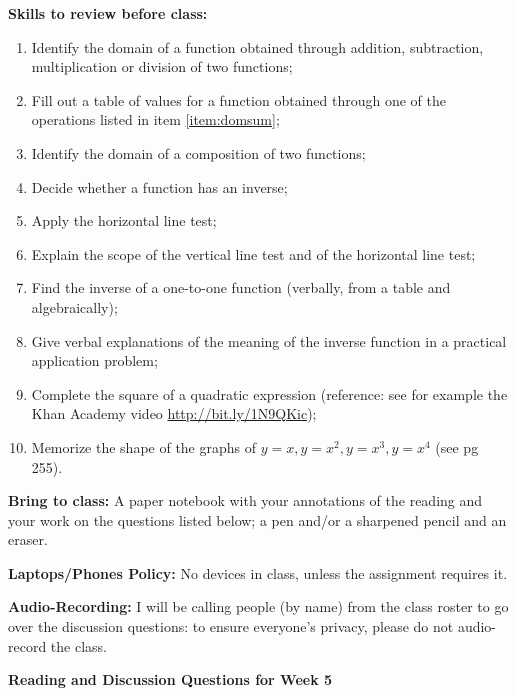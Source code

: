 \documentclass[12pt,dvipsnames]{article}
\begin{document}
	{\bfseries{Skills to review before class:} }
\begin{multicols}{2}
	\begin{enumerate}[topsep=0pt,itemsep=-2ex,partopsep=0ex,parsep=1ex]
		\item \label{item:domsum} Identify the domain of a function obtained through addition, subtraction, multiplication or division of two functions;
		\item Fill out a table of values for a function obtained through one of the operations listed in item \ref{item:domsum};
		\item Identify the domain of a composition of two functions;
		\item Decide whether a function has an inverse;
		\item Apply the horizontal line test;
		\item Explain the scope of the vertical line test and of the horizontal line test;
		\item Find the inverse of a one-to-one function (verbally, from a table and algebraically);
		\item Give verbal explanations of the meaning of the inverse function in a practical application problem;
		\item Complete the square of a quadratic expression (reference: see for example the Khan Academy video \url{http://bit.ly/1N9QKic});
                     \item Memorize the shape of the graphs of $\displaystyle y=x, y=x^2, y=x^3, y=x^4$ (see pg 255).
		
	\end{enumerate}
		
\end{multicols}
{\bfseries{Bring to class:} } A paper notebook with your annotations of the reading and your work on the questions listed below; a pen and/or a sharpened pencil and an eraser.

{\bfseries{Laptops/Phones Policy:}}  No devices in class, unless the assignment requires it.

{\bfseries{Audio-Recording:}} I will be calling people (by name) from the class roster to go over the discussion questions: to ensure everyone's privacy, please do not audio-record the class.


\begin{center}

{\large{\bfseries{Reading and Discussion Questions for Week 5} }}
\end{center}
\end{document}
